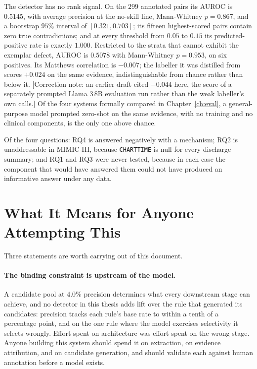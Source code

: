 The detector has no rank signal. On the $299$ annotated pairs its AUROC is
$0.5145$, with average precision at the no-skill line, Mann-Whitney $p = 0.867$,
and a bootstrap $95\%$ interval of $[0.321, 0.703]$; its fifteen highest-scored
pairs contain zero true contradictions; and at every threshold from $0.05$ to
$0.15$ its predicted-positive rate is exactly $1.000$. Restricted to the strata
that cannot exhibit the exemplar defect, AUROC is $0.5078$ with Mann-Whitney
$p = 0.953$, on six positives. Its Matthews correlation is $-0.007$; the
labeller it was distilled from scores $+0.024$ on the same evidence,
indistinguishable from chance rather than below it. [Correction note: an
earlier draft cited $-0.044$ here, the score of a separately prompted Llama
3\,8B evaluation run rather than the weak labeller's own calls.] Of the four
systems formally compared in Chapter~\ref{ch:eval}, a general-purpose model
prompted zero-shot on the same evidence, with no training and no clinical
components, is the only one above chance.

Of the four questions: RQ4 is answered negatively with a mechanism; RQ2 is
unaddressable in MIMIC-III, because \texttt{CHARTTIME} is null for every
discharge summary; and RQ1 and RQ3 were never tested, because in each case the
component that would have answered them could not have produced an informative
answer under any data.

\section{What It Means for Anyone Attempting This}
\label{sec:conc-means}

Three statements are worth carrying out of this document.

\paragraph{The binding constraint is upstream of the model.} A candidate pool at
$4.0\%$ precision determines what every downstream stage can achieve, and no
detector in this thesis adds lift over the rule that generated its candidates:
precision tracks each rule's base rate to within a tenth of a percentage point,
and on the one rule where the model exercises selectivity it selects wrongly.
Effort spent on architecture was effort spent on the wrong stage. Anyone
building this system should spend it on extraction, on evidence attribution, and
on candidate generation, and should validate each against human annotation
before a model exists.


